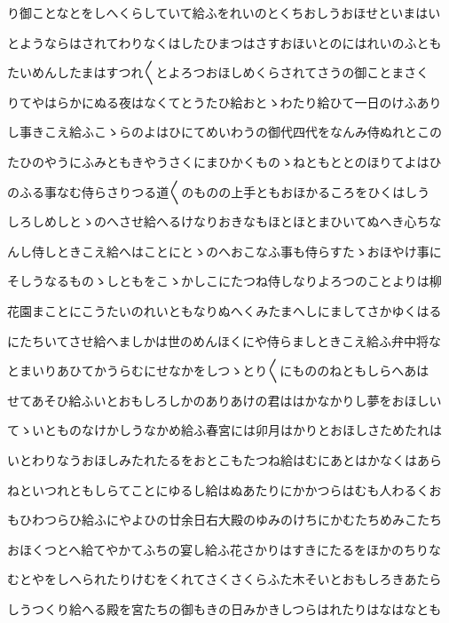\documentclass[a4paper,11pt,landscape]{ltjtarticle}
\begin{document}
\par\medskip
り御ことなとをしへくらしていて給ふをれいのとくちおしうおほせといまはい
\par\medskip
とようならはされてわりなくはしたひまつはさすおほいとのにはれいのふとも
\par\medskip
たいめんしたまはすつれ〱とよろつおほしめくらされてさうの御ことまさく
\par\medskip
りてやはらかにぬる夜はなくてとうたひ給おとゝわたり給ひて一日のけふあり
\par\medskip
し事きこえ給ふこゝらのよはひにてめいわうの御代四代をなんみ侍ぬれとこの
\par\medskip
たひのやうにふみともきやうさくにまひかくものゝねともととのほりてよはひ
\par\medskip
のふる事なむ侍らさりつる道〱のものの上手ともおほかるころをひくはしう
\par\medskip
しろしめしとゝのへさせ給へるけなりおきなもほとほとまひいてぬへき心ちな
\par\medskip
んし侍しときこえ給へはことにとゝのへおこなふ事も侍らすたゝおほやけ事に
\par\medskip
そしうなるものゝしともをこゝかしこにたつね侍しなりよろつのことよりは柳
\par\medskip
花園まことにこうたいのれいともなりぬへくみたまへしにましてさかゆくはる
\par\medskip
にたちいてさせ給へましかは世のめんほくにや侍らましときこえ給ふ弁中将な
\par\medskip
とまいりあひてかうらむにせなかをしつゝとり〱にもののねともしらへあは
\par\medskip
せてあそひ給ふいとおもしろしかのありあけの君ははかなかりし夢をおほしい
\par\medskip
てゝいとものなけかしうなかめ給ふ春宮には卯月はかりとおほしさためたれは
\par\medskip
いとわりなうおほしみたれたるをおとこもたつね給はむにあとはかなくはあら
\par\medskip
ねといつれともしらてことにゆるし給はぬあたりにかかつらはむも人わるくお
\par\medskip
もひわつらひ給ふにやよひの廿余日右大殿のゆみのけちにかむたちめみこたち
\par\medskip
おほくつとへ給てやかてふちの宴し給ふ花さかりはすきにたるをほかのちりな
\par\medskip
むとやをしへられたりけむをくれてさくさくらふた木そいとおもしろきあたら
\par\medskip
しうつくり給へる殿を宮たちの御もきの日みかきしつらはれたりはなはなとも
\par\medskip
\end{document}
